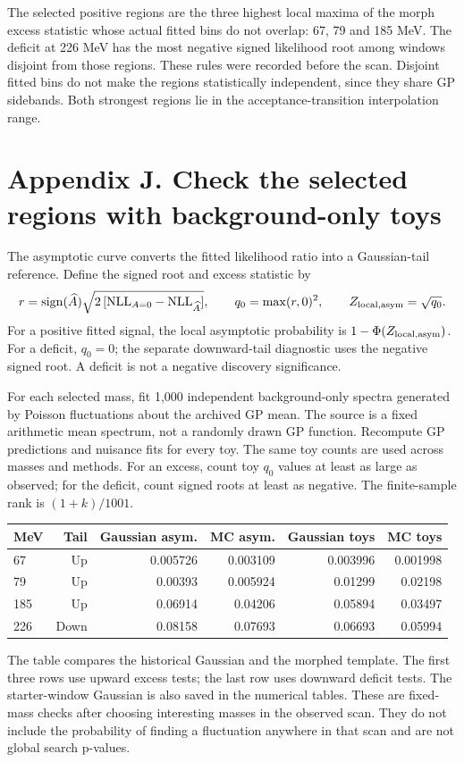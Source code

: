 \documentclass[11pt]{article}
\begin{document}
The selected positive regions are the three highest local maxima of the morph excess statistic whose actual fitted bins do not overlap: 67, 79 and 185 MeV. The deficit at 226 MeV has the most negative signed likelihood root among windows disjoint from those regions. These rules were recorded before the scan. Disjoint fitted bins do not make the regions statistically independent, since they share GP sidebands. Both strongest regions lie in the acceptance-transition interpolation range.
\clearpage\section*{Appendix J. Check the selected regions with background-only toys}

The asymptotic curve converts the fitted likelihood ratio into a Gaussian-tail reference. Define the signed root and excess statistic by
\[
 r=\operatorname{sign}(\widehat A)\sqrt{2\,[\mathrm{NLL}_{A=0}-\mathrm{NLL}_{\widehat A}]},
 \qquad q_0=\max(r,0)^2,\qquad Z_{\rm local,asym}=\sqrt{q_0}.
\]
For a positive fitted signal, the local asymptotic probability is $1-\Phi(Z_{\rm local,asym})$. For a deficit, $q_0=0$; the separate downward-tail diagnostic uses the negative signed root. A deficit is not a negative discovery significance.

For each selected mass, fit 1,000 independent background-only spectra generated by Poisson fluctuations about the archived GP mean. The source is a fixed arithmetic mean spectrum, not a randomly drawn GP function. Recompute GP predictions and nuisance fits for every toy. The same toy counts are used across masses and methods. For an excess, count toy $q_0$ values at least as large as observed; for the deficit, count signed roots at least as negative. The finite-sample rank is $(1+k)/1001$.
\begin{center}\small\begin{tabular}{lrrrrr}\toprule
MeV & Tail & Gaussian asym. & MC asym. & Gaussian toys & MC toys\\\midrule
67 & Up & 0.005726 & 0.003109 & 0.003996 & 0.001998\\
79 & Up & 0.00393 & 0.005924 & 0.01299 & 0.02198\\
185 & Up & 0.06914 & 0.04206 & 0.05894 & 0.03497\\
226 & Down & 0.08158 & 0.07693 & 0.06693 & 0.05994\\
\bottomrule\end{tabular}\end{center}
The table compares the historical Gaussian and the morphed template. The first three rows use upward excess tests; the last row uses downward deficit tests. The starter-window Gaussian is also saved in the numerical tables. These are fixed-mass checks after choosing interesting masses in the observed scan. They do not include the probability of finding a fluctuation anywhere in that scan and are not global search p-values.
\end{document}
